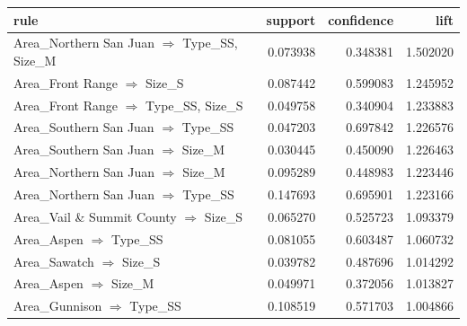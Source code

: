 \begin{tabular}{lrrr}
\toprule
rule & support & confidence & lift \\
\midrule
Area\_Northern San Juan $\Rightarrow$ Type\_SS, Size\_M & 0.073938 & 0.348381 & 1.502020 \\
Area\_Front Range $\Rightarrow$ Size\_S & 0.087442 & 0.599083 & 1.245952 \\
Area\_Front Range $\Rightarrow$ Type\_SS, Size\_S & 0.049758 & 0.340904 & 1.233883 \\
Area\_Southern San Juan $\Rightarrow$ Type\_SS & 0.047203 & 0.697842 & 1.226576 \\
Area\_Southern San Juan $\Rightarrow$ Size\_M & 0.030445 & 0.450090 & 1.226463 \\
Area\_Northern San Juan $\Rightarrow$ Size\_M & 0.095289 & 0.448983 & 1.223446 \\
Area\_Northern San Juan $\Rightarrow$ Type\_SS & 0.147693 & 0.695901 & 1.223166 \\
Area\_Vail \& Summit County $\Rightarrow$ Size\_S & 0.065270 & 0.525723 & 1.093379 \\
Area\_Aspen $\Rightarrow$ Type\_SS & 0.081055 & 0.603487 & 1.060732 \\
Area\_Sawatch $\Rightarrow$ Size\_S & 0.039782 & 0.487696 & 1.014292 \\
Area\_Aspen $\Rightarrow$ Size\_M & 0.049971 & 0.372056 & 1.013827 \\
Area\_Gunnison $\Rightarrow$ Type\_SS & 0.108519 & 0.571703 & 1.004866 \\
\bottomrule
\end{tabular}
